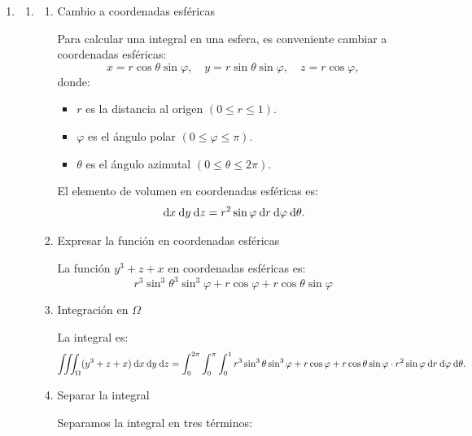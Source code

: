 \begin{enumerate}[label=\color{red}\textbf{\arabic*)}, leftmargin=*]
\item {}
\begin{enumerate}[label=\color{red}\textbf{\alph*)}]
\item {}

  \begin{enumerate}[label=\arabic*)]
    \item Cambio a coordenadas esféricas

      Para calcular una integral en una esfera, es conveniente cambiar a coordenadas esféricas: \[
      x=r\cos\theta\sin\varphi,\quad y=r\sin\theta\sin\varphi, \quad z=r\cos\varphi,
      \] donde:
      \begin{itemize}[label=\textbullet]
        \item $r$ es la distancia al origen $(0\le r\le 1)$.
        \item $\varphi$ es el ángulo polar $(0\le \varphi\le \pi)$.
        \item $\theta$ es el ángulo azimutal $(0\le \theta\le 2\pi)$.
      \end{itemize}
      El elemento de volumen en coordenadas esféricas es: \[
      \:\mathrm{d}x \:\mathrm{d}y \:\mathrm{d}z =r^2 \sin\varphi\:\mathrm{d}r \:\mathrm{d}\varphi\:\mathrm{d}\theta .
      \] 
    \item Expresar la función en coordenadas esféricas

      La función $y^3+z+x$ en coordenadas esféricas es: \[
      r^3 \sin^3\theta^3 \sin^3\varphi + r \cos\varphi + r \cos \theta \sin \varphi
      \] 

    \item Integración en $\Omega$

      La integral es: \[
    \iiint_{\Omega}(y^3+z+x)\:\mathrm{d}x \:\mathrm{d}y \:\mathrm{d}z=\int_{0}^{2\pi} \int_{0}^{\pi} \int_{0}^{1} r^3 \sin ^3\theta \sin ^3\varphi+r \cos\varphi+r \cos\theta \sin \varphi\cdot  r^2\sin\varphi\:\mathrm{d}r \:\mathrm{d}\varphi\:\mathrm{d}\theta .
    \] 

  \item Separar la integral

    Separamos la integral en tres términos:


\end{enumerate}
\end{enumerate}
\end{enumerate}
